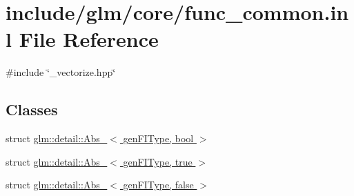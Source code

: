 \hypertarget{func__common_8inl}{\section{include/glm/core/func\-\_\-common.inl \-File \-Reference}
\label{func__common_8inl}
}
{\ttfamily \#include \char`\"{}\-\_\-vectorize.\-hpp\char`\"{}}\*
\subsection*{\-Classes}
\begin{DoxyCompactItemize}
\item 
struct \hyperlink{structglm_1_1detail_1_1Abs__}{glm\-::detail\-::\-Abs\-\_\-$<$ gen\-F\-I\-Type, bool $>$}
\item 
struct \hyperlink{structglm_1_1detail_1_1Abs___3_01genFIType_00_01true_01_4}{glm\-::detail\-::\-Abs\-\_\-$<$ gen\-F\-I\-Type, true $>$}
\item 
struct \hyperlink{structglm_1_1detail_1_1Abs___3_01genFIType_00_01false_01_4}{glm\-::detail\-::\-Abs\-\_\-$<$ gen\-F\-I\-Type, false $>$}
\end{DoxyCompactItemize}
